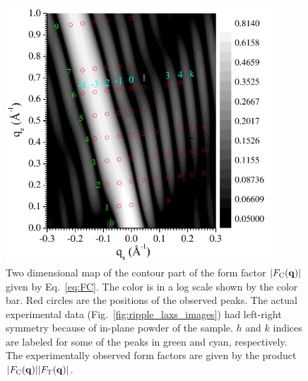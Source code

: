 \begin{figure}[htbp]
  \centering
  \includegraphics[width=0.9\textwidth]{figures/ripple/model/FT}
  \caption[Two dimensional map of $\FC$]
  {Two dimensional map of the contour part of the form factor $|F_\mathrm{C}(\mathbf{q})|$ given by
  Eq.~\ref{eq:FC}. The color is in a log scale shown by the color bar.
  Red circles are the positions of the observed peaks. The actual
  experimental data (Fig.~\ref{fig:ripple_laxs_images}) had left-right symmetry 
  because of in-plane powder of the sample.
  $h$ and $k$ indices are labeled for some of the peaks in green and cyan,
  respectively. The experimentally observed form factors are given by 
  the product $|F_\mathrm{C}(\mathbf{q})||F_\mathrm{T}(\mathbf{q})|$.}
  \label{fig:FC}
\end{figure}


